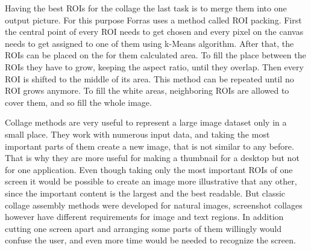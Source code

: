 \documentclass[draft,final]{vutinfth} %
\begin{document}
Having the best ROIs for the collage the last task is to merge them into one output picture.
For this purpose Forras uses a method called ROI packing.
First the central point of every ROI needs to get chosen and every pixel on the canvas needs to get assigned to one of them using k-Means algorithm.
After that, the ROIs can be placed on the  for them calculated  area.
To fill the place between the ROIs they have to grow, keeping the aspect ratio, until they overlap. 
Then every ROI is shifted to the middle of its area.
This method can be repeated until no ROI grows anymore.
To fill the white areas, neighboring ROIs are allowed to cover them, and so fill the whole image.\par
Collage methods are very useful to represent a large image dataset only in a small place.
They work with numerous input data, and taking the most important parts of them create a new image, that is not similar to any before.
That is why they are more useful for making a thumbnail for a desktop but not for one application.
Even though taking only the most important ROIs of one screen it would be possible to create an image more illustrative that any other, since the important content is the largest and the best readable.
But classic collage assembly methods were developed for natural images, screenshot collages however have different requirements for image and text regions.
In addition cutting one screen apart and arranging some parts of them willingly would confuse the user, and even more time would be needed to recognize the screen.
\end{document}
